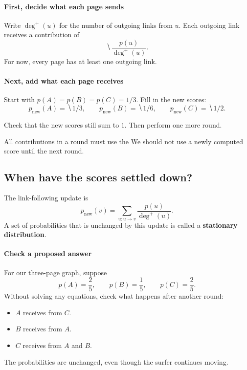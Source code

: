 \documentclass[11pt]{article}
\begin{document}
\paragraph{First, decide what each page sends}
Write $\deg^+(u)$ for the number of outgoing links from $u$. Each outgoing
link receives a contribution of
\begin{equation*}
    \hide{\frac{p(u)}{\deg^+(u)}}.
\end{equation*}
For now, every page has at least one outgoing link.

\paragraph{Next, add what each page receives}
Start with $p(A)=p(B)=p(C)=1/3$. Fill in the new scores:
\begin{equation*}
    p_{\mathrm{new}}(A)=\hide{1/3},\qquad
    p_{\mathrm{new}}(B)=\hide{1/6},\qquad
    p_{\mathrm{new}}(C)=\hide{1/2}.
\end{equation*}

Check that the new scores still sum to $1$. Then perform one more round.
\vs{1.2cm}

\vfill
All contributions in a round must use the  We should not
use a newly computed score until the next round.

\newpage
\subsection*{When have the scores settled down?}
The link-following update is
\begin{equation*}
    p_{\mathrm{new}}(v)=\sum_{u:u\to v}\frac{p(u)}{\deg^+(u)}.
\end{equation*}
A set of probabilities that is unchanged by this update is called a
\textbf{stationary distribution}.

\paragraph{Check a proposed answer}
For our three-page graph, suppose
\begin{equation*}
    p(A)=\frac25,\qquad p(B)=\frac15,\qquad p(C)=\frac25.
\end{equation*}
Without solving any equations, check what happens after another round:
\begin{itemize}
    \item $A$ receives  from $C$.
    \vs{.3cm}
    \item $B$ receives  from $A$.
    \vs{.3cm}
    \item $C$ receives  from $A$ and $B$.
\end{itemize}
The probabilities are unchanged, even though the surfer continues moving.
\end{document}
